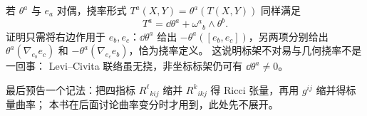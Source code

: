若 \(\theta^a\) 与 \(e_a\) 对偶，挠率形式
\(T^a(X,Y)=\theta^a(T(X,Y))\) 同样满足
\[
T^a=\dd\theta^a+\omega^a{}_b\wedge\theta^b.
\]
证明只需将右边作用于 \(e_b,e_c\)：\(\dd\theta^a\)
给出 \(-\theta^a([e_b,e_c])\)，另两项分别给出
\(\theta^a(\nabla_{e_b}e_c)\) 和
\(-\theta^a(\nabla_{e_c}e_b)\)，恰为挠率定义。
这说明标架不对易与几何挠率不是一回事：
Levi--Civita 联络虽无挠，非坐标标架仍可有 \(\dd\theta^a\ne0\)。

最后预告一个记法：把四指标 \(R^\ell{}_{kij}\) 缩并
\(R^k{}_{ikj}\) 得 Ricci 张量，再用 \(g^{ij}\) 缩并得标量曲率；
本书在后面讨论曲率变分时才用到，此处先不展开。

